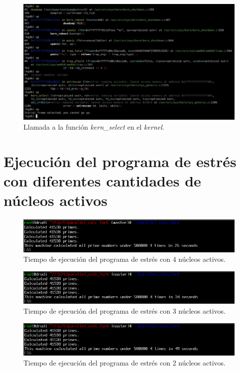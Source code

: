 \vspace{.50cm}
\begin{figure}[H]
    \centering
    \includegraphics[width=1\textwidth]{images/kgdb_kern-select.jpeg}
    \caption{Llamada a la función \textit{kern\_select} en el \textit{kernel}.}
    \label{fig:kgdb_kern-select}
\end{figure}

\chapter{Ejecución del programa de estrés con diferentes cantidades de núcleos activos}\label{appendix:apD}

\begin{figure}[H]
    \centering
    \includegraphics[width=1\textwidth]{images/cpuOnOff-4CPUsTime.png}
    \caption{Tiempo de ejecución del programa de estrés con 4 núcleos activos.}
    \label{fig:cpuOnOff-4CPUsTime}
\end{figure}

\begin{figure}[H]
    \centering
    \includegraphics[width=1\textwidth]{images/cpuOnOff-3CPUsTime.png}
    \caption{Tiempo de ejecución del programa de estrés con 3 núcleos activos.}
    \label{fig:cpuOnOff-3CPUsTime}
\end{figure}

\begin{figure}[H]
    \centering
    \includegraphics[width=1\textwidth]{images/cpuOnOff-2CPUsTime.png}
    \caption{Tiempo de ejecución del programa de estrés con 2 núcleos activos.}
    \label{fig:cpuOnOff-2CPUsTime}
\end{figure}
